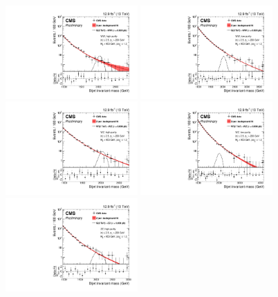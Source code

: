 \begin{figure}[h!]
\centering
\includegraphics[width=0.45\textwidth]{figures/analysis/search2/B2G-16-021/figures/mjj/MLBkgFit_DijetMassHighPuriWW.pdf}
\includegraphics[width=0.45\textwidth]{figures/analysis/search2/B2G-16-021/figures/mjj/MLBkgFit_DijetMassLowPuriWW.pdf}\\
\includegraphics[width=0.45\textwidth]{figures/analysis/search2/B2G-16-021/figures/mjj/MLBkgFit_DijetMassHighPuriWZ.pdf}
\includegraphics[width=0.45\textwidth]{figures/analysis/search2/B2G-16-021/figures/mjj/MLBkgFit_DijetMassLowPuriWZ.pdf}\\
\includegraphics[width=0.45\textwidth]{figures/analysis/search2/B2G-16-021/figures/mjj/MLBkgFit_DijetMassHighPuriZZ.pdf}

\end{figure}
